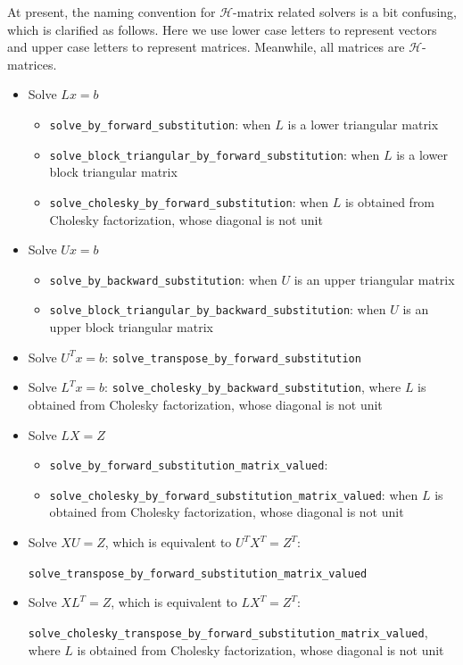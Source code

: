 \documentclass[11pt, a4paper]{book}
\begin{document}
At present, the naming convention for $\mathcal{H}$-matrix related solvers is a bit confusing, which is clarified as follows. Here we use lower case letters to represent vectors and upper case letters to represent matrices. Meanwhile, all matrices are $\mathcal{H}$-matrices.
\begin{itemize}
\item Solve \(Lx=b\)
\begin{itemize}
\item \texttt{solve\_by\_forward\_substitution}: when \(L\) is a lower triangular matrix
\item \texttt{solve\_block\_triangular\_by\_forward\_substitution}: when \(L\) is a lower block triangular matrix
\item \texttt{solve\_cholesky\_by\_forward\_substitution}: when \(L\) is obtained from Cholesky factorization, whose diagonal is not unit
\end{itemize}
\item Solve \(Ux=b\)
\begin{itemize}
\item \texttt{solve\_by\_backward\_substitution}: when \(U\) is an upper triangular matrix
\item \texttt{solve\_block\_triangular\_by\_backward\_substitution}: when \(U\) is an upper block triangular matrix
\end{itemize}
\item Solve \(U^Tx=b\): \texttt{solve\_transpose\_by\_forward\_substitution}
\item Solve \(L^Tx=b\): \texttt{solve\_cholesky\_by\_backward\_substitution}, where \(L\)
  is obtained from Cholesky factorization, whose diagonal is not unit
\item Solve \(LX=Z\)
\begin{itemize}
\item \texttt{solve\_by\_forward\_substitution\_matrix\_valued}:
\item \texttt{solve\_cholesky\_by\_forward\_substitution\_matrix\_valued}: when \(L\) is obtained from Cholesky factorization, whose diagonal is not unit
\end{itemize}
\item Solve \(XU=Z\), which is equivalent to \(U^T X^T=Z^T\):

  \texttt{solve\_transpose\_by\_forward\_substitution\_matrix\_valued}
\item Solve \(XL^T=Z\), which is equivalent to \(L X^T=Z^T\):

  \texttt{solve\_cholesky\_transpose\_by\_forward\_substitution\_matrix\_valued}, where
  \(L\) is obtained from Cholesky factorization, whose diagonal is not unit
\end{itemize}
\end{document}
